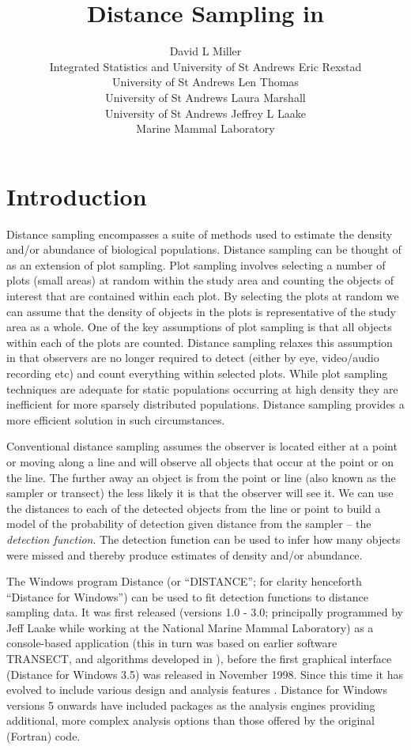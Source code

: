 \documentclass[article,shortnames]{jss}
\author{
David L Miller\\Integrated Statistics and University of St Andrews \AND Eric Rexstad\\University of St Andrews \And Len Thomas\\University of St Andrews \AND Laura Marshall\\University of St Andrews \And Jeffrey L Laake\\Marine Mammal Laboratory
}
\title{Distance Sampling in \proglang{R}}
\begin{document}
\section{Introduction}\label{introduction}

Distance sampling
\citep{Buckland:2001vm, Buckland:2004ts, buckland2015distance}
encompasses a suite of methods used to estimate the density and/or
abundance of biological populations. Distance sampling can be thought of
as an extension of plot sampling. Plot sampling involves selecting a
number of plots (small areas) at random within the study area and
counting the objects of interest that are contained within each plot. By
selecting the plots at random we can assume that the density of objects
in the plots is representative of the study area as a whole. One of the
key assumptions of plot sampling is that all objects within each of the
plots are counted. Distance sampling relaxes this assumption in that
observers are no longer required to detect (either by eye, video/audio
recording etc) and count everything within selected plots. While plot
sampling techniques are adequate for static populations occurring at
high density they are inefficient for more sparsely distributed
populations. Distance sampling provides a more efficient solution in
such circumstances.

Conventional distance sampling assumes the observer is located either at
a point or moving along a line and will observe all objects that occur
at the point or on the line. The further away an object is from the
point or line (also known as the sampler or transect) the less likely it
is that the observer will see it. We can use the distances to each of
the detected objects from the line or point to build a model of the
probability of detection given distance from the sampler -- the
\emph{detection function}. The detection function can be used to infer
how many objects were missed and thereby produce estimates of density
and/or abundance.

The Windows program Distance (or ``DISTANCE''; for clarity henceforth
``Distance for Windows'') can be used to fit detection functions to
distance sampling data. It was first released (versions 1.0 - 3.0;
principally programmed by Jeff Laake while working at the National
Marine Mammal Laboratory) as a console-based application (this in turn
was based on earlier software TRANSECT, \citet{Burnham:1980wz} and
algorithms developed in \citet{Buckland:1992fa}), before the first
graphical interface (Distance for Windows 3.5) was released in November
1998. Since this time it has evolved to include various design and
analysis features \citep{Thomas:2010cf}. Distance for Windows versions 5
onwards have included  \citep{rcore} packages as the
analysis engines providing additional, more complex analysis options
than those offered by the original (Fortran) code.
\end{document}
